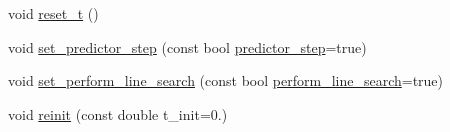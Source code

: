 \begin{DoxyCompactItemize}
\item 
void \hyperlink{classincremental_f_e_1_1_global_data_incremental_f_e_ab86938372e460e4253c5cc22edffbf94}{reset\+\_\+t} ()
\item 
void \hyperlink{classincremental_f_e_1_1_global_data_incremental_f_e_ae8037538c6a7fc8b05168fe006ed2083}{set\+\_\+predictor\+\_\+step} (const bool \hyperlink{classincremental_f_e_1_1_global_data_incremental_f_e_afe172fdb882f9dd0cd5f963386dd2ffb}{predictor\+\_\+step}=true)
\item 
void \hyperlink{classincremental_f_e_1_1_global_data_incremental_f_e_ad3cd830a41c4b92c69d2083864ac7478}{set\+\_\+perform\+\_\+line\+\_\+search} (const bool \hyperlink{classincremental_f_e_1_1_global_data_incremental_f_e_a2253a9b142315cbccac38c8b8dc83824}{perform\+\_\+line\+\_\+search}=true)
\item 
void \hyperlink{classincremental_f_e_1_1_global_data_incremental_f_e_a74424d0040a6f5c2aa545288b42483f4}{reinit} (const double t\+\_\+init=0.)
\end{DoxyCompactItemize}
